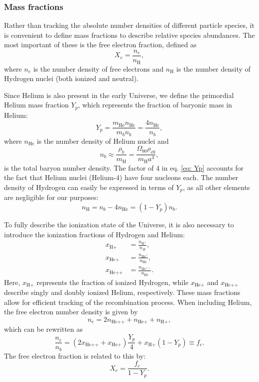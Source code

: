 \documentclass{aa}
\numberwithin{equation}{section}
\numberwithin{table}{section}
\numberwithin{figure}{section}
\begin{document}
\subsubsection{Mass fractions}\label{subsubsec: II theory mass fractions}
Rather than tracking the absolute number densities of different particle species, it is convenient to define mass fractions to describe relative species abundances. The most important of these is the free electron fraction, defined as
\begin{equation}
X_e = \frac{n_e}{n_\text{H}},
\end{equation}
where $n_e$ is the number density of free electrons and $n_\text{H}$ is the number density of Hydrogen nuclei (both ionized and neutral).

Since Helium is also present in the early Universe, we define the primordial Helium mass fraction $Y_p$, which represents the fraction of baryonic mass in Helium:
\begin{equation}
Y_p = \frac{m_\text{He} n_{\text{He}}}{m_bn_{b}} = \frac{4 n_{\text{He}}}{n_{b}}, \label{eq: Yp}
\end{equation}
where $n_{\text{He}}$ is the number density of Helium nuclei and
\begin{equation}
  n_b \approx \frac{\rho_b}{m_\text{H}} = \frac{\Omega_{b0} \rho_{c0}}{m_\text{H} a^3}, \label{eq: nb}
\end{equation}
is the total baryon number density. The factor of 4 in eq. \eqref{eq: Yp} accounts for the fact that Helium nuclei (Helium-4) have four nucleons each. The number density of Hydrogen can easily be expressed in terms of $Y_p$, as all other elements are negligible for our purposes:
\begin{equation}
  n_\text{H} = n_b - 4n_\text{He} = (1-Y_p)n_b.
\end{equation}

To fully describe the ionization state of the Universe, it is also necessary to introduce the ionization fractions of Hydrogen and Helium:
\begin{align}
x_{\text{H+}} &= \frac{n_{\text{H}^+}}{n_H}, \\
x_{\text{He+}} &= \frac{n_{\text{He}^+}}{n_{\text{He}}}, \\
x_{\text{He++}} &= \frac{n_{\text{He}^{++}}}{n_{\text{He}}}.
\end{align}
Here, $x_{\text{H+}}$ represents the fraction of ionized Hydrogen, while $x_{\text{He+}}$ and $x_{\text{He++}}$ describe singly and doubly ionized Helium, respectively. These mass fractions allow for efficient tracking of the recombination process. When including Helium, the free electron number density is given by
\begin{equation}
n_e = 2n_{\text{He++}} + n_{\text{He+}} + n_{\text{H+}},
\end{equation}
which can be rewritten as
\begin{equation}
\frac{n_e}{n_b} = (2 x_{\text{He++}} + x_{\text{He+}}) \frac{Y_p}{4} + x_{\text{H+}} (1 - Y_p) \equiv f_e. \label{eq: fe}
\end{equation}
The free electron fraction is related to this by:
\begin{equation}
X_e = \frac{f_e}{1 - Y_p}.
\end{equation}
\end{document}
